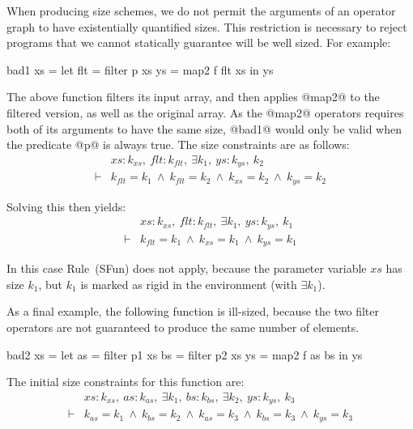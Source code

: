 When producing size schemes, we do not permit the arguments of an operator graph to have existentially quantified sizes. This restriction is necessary to reject programs that we cannot statically guarantee will be well sized. For example:
\begin{code}
    bad1 xs  = let flt   = filter p xs
                   ys    = map2   f flt xs
               in  ys
\end{code}
The above function filters its input array, and then applies @map2@ to the filtered version, as well as the original array. As the @map2@ operators requires both of its arguments to have the same size, @bad1@ would only be valid when the predicate @p@ is always true. The size constraints are as follows:
$$
\begin{array}{ll}
       & xs : k_{xs},~ flt : k_{flt},~ \exists k_1,~ ys : k_{ys},~ k_2
\\
\vdash &          k_{flt}  = k_1
        ~\wedge~  k_{flt}  = k_2
        ~\wedge~  k_{xs}   = k_2
        ~\wedge~  k_{ys}   = k_2
\end{array}
$$

\noindent
Solving this then yields:
$$
\begin{array}{ll}
       & xs : k_{xs},~ flt : k_{flt},~ \exists k_1,~ ys : k_{ys},~ k_1
\\
\vdash &          k_{flt}  = k_1
        ~\wedge~  k_{xs}   = k_1
        ~\wedge~  k_{ys}   = k_1
\end{array}
$$

In this case Rule~(SFun) does not apply, because the parameter variable $xs$ has size $k_1$, but $k_1$ is marked as rigid in the environment (with $\exists k_1$). 

As a final example, the following function is ill-sized, because the two filter operators are not guaranteed to produce the same number of elements.
\begin{code}
     bad2 xs = let as  = filter p1 xs
                   bs  = filter p2 xs
                   ys  = map2   f  as bs
               in  ys
\end{code}

The initial size constraints for this function are:
$$
\begin{array}{ll}
       & xs : k_{xs},~ as : k_{as},~ \exists k_1,~ bs : k_{bs},~ \exists k_2,~ ys : k_{ys},~ k_3
\\
\vdash &          k_{as}   = k_1
        ~\wedge~  k_{bs}   = k_2
        ~\wedge~  k_{as}   = k_3
        ~\wedge~  k_{bs}   = k_3
        ~\wedge~  k_{ys}   = k_3
\end{array}
$$

